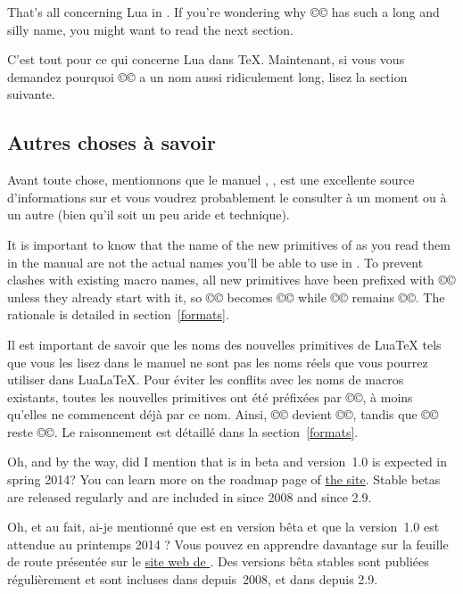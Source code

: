 \documentclass{lltxdoc}
\begin{document}
\medskip

That's all concerning Lua in \tex. If you're wondering why
©\luatexluaescapestring© has such a long and silly name, you might want to
read the next section.

C'est tout pour ce qui concerne Lua dans TeX. Maintenant, si vous vous demandez pourquoi ©\luatexluaescapestring© a un nom aussi ridiculement long, lisez la section suivante.

\subsection{Autres choses à savoir}\label{things}

Avant toute chose, mentionnons que le manuel \luatex, ,
est une excellente source d'informations sur \luatex et vous voudrez probablement
le consulter à un moment ou à un autre (bien qu'il soit un peu aride et technique).

It is important to know that the name of the new primitives of \luatex as you
read them in the manual are not the actual names you'll be able to use in
\lualatex. To prevent clashes with existing macro names, all new primitives
have been prefixed with ©\luatex© unless they already start with it, so
©\luaescapestring© becomes ©\luatexluaescapetring© while ©\luatexversion©
remains ©\luatexversion©. The rationale is detailed in section~\ref{formats}.

Il est important de savoir que les noms des nouvelles primitives de LuaTeX tels que vous les lisez dans le manuel ne sont pas les noms réels que vous pourrez utiliser dans LuaLaTeX. Pour éviter les conflits avec les noms de macros existants, toutes les nouvelles primitives ont été préfixées par ©\luatex©, à moins qu'elles ne commencent déjà par ce nom. Ainsi, ©\luaescapestring© devient ©\luatexluaescapetring©, tandis que ©\luatexversion© reste ©\luatexversion©. Le raisonnement est détaillé dans la section~\ref{formats}.

\medskip

Oh, and by the way, did I mention that \luatex is in beta and version~1.0 is
expected in spring 2014? You can learn more on the roadmap page of
\href{http://luatex.org/}{the \luatex site}. Stable betas are released
regularly and are included in \texlive since 2008 and \miktex since 2.9.

Oh, et au fait, ai-je mentionné que \luatex est en version bêta et que la version~1.0 est attendue au printemps 2014 ? Vous pouvez en apprendre davantage sur la feuille de route présentée sur le \href{http://luatex.org/}{site web de \luatex}. Des versions bêta stables sont publiées régulièrement et sont incluses dans \texlive depuis~2008, et dans \miktex depuis 2.9.
\end{document}
